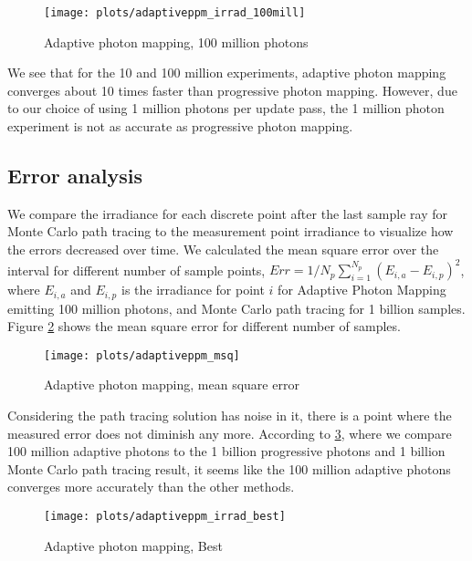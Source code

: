 \begin{figure}
    \centering
    \texttt{[image: plots/adaptiveppm\_irrad\_100mill]}\\
    \caption{Adaptive photon mapping, 100 million photons}
    \label{fig:adaptive_irrad100}
\end{figure}

We see that for the 10 and 100 million experiments, adaptive photon mapping converges about 10 times faster than progressive photon mapping. However, due to our choice of using 1 million photons per update pass, the 1 million photon experiment is not as accurate as progressive photon mapping.

\subsection*{Error analysis}
We compare the irradiance for each discrete point after the last sample ray for Monte Carlo path tracing to the measurement point irradiance to visualize how the errors decreased over time. We calculated the mean square error over the interval for different number of sample points, $Err = 1/N_p \sum_{i=1}^{N_p} (E_{i,a} - E_{i,p})^2$, where $E_{i,a}$ and $E_{i,p}$ is the irradiance for point $i$ for Adaptive Photon Mapping emitting 100 million photons, and Monte Carlo path tracing for 1 billion samples. Figure \ref{fig:adaptive_msq} shows the mean square error for different number of samples.

\begin{figure}
    \centering
    \texttt{[image: plots/adaptiveppm\_msq]}\\
    \caption{Adaptive photon mapping, mean square error}
    \label{fig:adaptive_msq}
\end{figure}

Considering the path tracing solution has noise in it, there is a point where the measured error does not diminish any more. According to \ref{fig:adaptive_best}, where we compare 100 million adaptive photons to the 1 billion progressive photons and 1 billion Monte Carlo path tracing result, it seems like the 100 million adaptive photons converges more accurately than the other methods. 

\begin{figure}
    \centering
    \texttt{[image: plots/adaptiveppm\_irrad\_best]}\\
    \caption{Adaptive photon mapping, Best}
    \label{fig:adaptive_best}
\end{figure}


